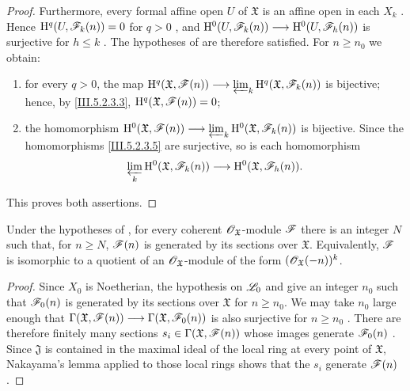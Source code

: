\begin{proof}
Furthermore, every formal affine open $U$ of $\mathfrak{X}$ is an
affine open in each $X_k$ .  Hence
$\mathrm{H}^q(U,\mathscr{F}_k(n))=0$ for $q>0$ , and $\mathrm{H}^0(U,\mathscr{F}_k(n))
\longrightarrow
\mathrm{H}^0(U,\mathscr{F}_h(n))$
is surjective for $h\leq k$ .  The hypotheses of
 are therefore satisfied.  For $n\geq n_0$ we
obtain:
\begin{enumerate}
  \item[$1^\circ$] for every $q>0$, the map $\mathrm{H}^q(\mathfrak{X},\mathscr{F}(n))
\longrightarrow
\varprojlim_k
\mathrm{H}^q(\mathfrak{X},\mathscr{F}_k(n))$
    is bijective; hence, by \eqref{III.5.2.3.3},
    $\mathrm{H}^q(\mathfrak{X},\mathscr{F}(n))=0$;
  \item[$2^\circ$] the homomorphism $\mathrm{H}^0(\mathfrak{X},\mathscr{F}(n))
\longrightarrow
\varprojlim_k
\mathrm{H}^0(\mathfrak{X},\mathscr{F}_k(n))$
    is bijective.  Since the homomorphisms
    \eqref{III.5.2.3.5} are surjective, so is each homomorphism
    \[
      \varprojlim_k
      \mathrm{H}^0(\mathfrak{X},\mathscr{F}_k(n))
      \longrightarrow
      \mathrm{H}^0(\mathfrak{X},\mathscr{F}_h(n)).
    \]
\end{enumerate}
This proves both assertions.
\end{proof}

\begin{corollary}[5.2.4]
\label{III.5.2.4}
Under the hypotheses of , for every coherent
$\mathscr{O}_{\mathfrak{X}}$-module $\mathscr{F}$ there is an integer $N$
such that, for $n\geq N$, $\mathscr{F}(n)$ is generated by its sections
over
$\mathfrak{X}$.  Equivalently, $\mathscr{F}$ is isomorphic to a quotient
of an $\mathscr{O}_{\mathfrak{X}}$-module of the form
$(\mathscr{O}_{\mathfrak{X}}(- n))^k$.
\end{corollary}

\begin{proof}
Since $X_0$ is Noetherian, the hypothesis on $\mathscr{L}_0$ and
 give an integer $n_0$ such that
$\mathscr{F}_0(n)$ is generated by its sections over $\mathfrak{X}$ for
$n\geq n_0$.  We may take $n_0$ large enough that $\Gamma(\mathfrak{X},\mathscr{F}(n))
\longrightarrow
\Gamma(\mathfrak{X},\mathscr{F}_0(n))$
is also surjective for $n\geq n_0$ .  There are
therefore finitely many sections
$s_i\in\Gamma(\mathfrak{X},\mathscr{F}(n))$ whose images generate
$\mathscr{F}_0(n)$ .  Since $\mathfrak{J}$ is
contained in the maximal ideal of the local ring at every point
of $\mathfrak{X}$, Nakayama's lemma applied to those local rings
shows that the $s_i$ generate $\mathscr{F}(n)$
.
\end{proof}

